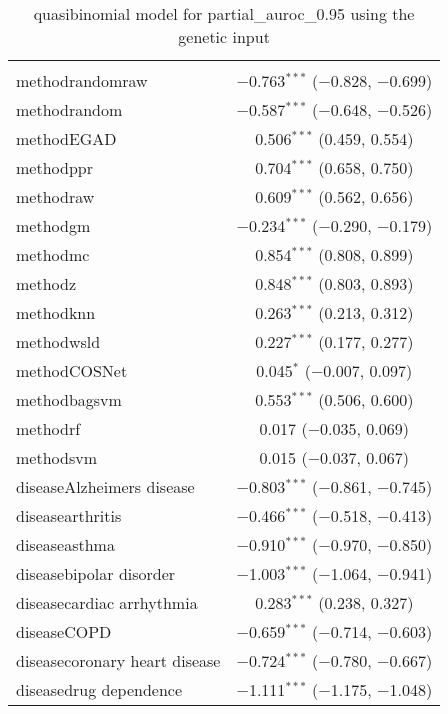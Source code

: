 
\begin{table}[!htbp] \centering 
  \caption{quasibinomial model for partial_auroc_0.95 using the genetic input} 
  \label{} 
\begin{tabular}{@{\extracolsep{5pt}}lc} 
\\[-1.8ex]\hline 
\hline \\[-1.8ex] 
 methodrandomraw & $-$0.763$^{***}$ ($-$0.828, $-$0.699) \\ 
  methodrandom & $-$0.587$^{***}$ ($-$0.648, $-$0.526) \\ 
  methodEGAD & 0.506$^{***}$ (0.459, 0.554) \\ 
  methodppr & 0.704$^{***}$ (0.658, 0.750) \\ 
  methodraw & 0.609$^{***}$ (0.562, 0.656) \\ 
  methodgm & $-$0.234$^{***}$ ($-$0.290, $-$0.179) \\ 
  methodmc & 0.854$^{***}$ (0.808, 0.899) \\ 
  methodz & 0.848$^{***}$ (0.803, 0.893) \\ 
  methodknn & 0.263$^{***}$ (0.213, 0.312) \\ 
  methodwsld & 0.227$^{***}$ (0.177, 0.277) \\ 
  methodCOSNet & 0.045$^{*}$ ($-$0.007, 0.097) \\ 
  methodbagsvm & 0.553$^{***}$ (0.506, 0.600) \\ 
  methodrf & 0.017 ($-$0.035, 0.069) \\ 
  methodsvm & 0.015 ($-$0.037, 0.067) \\ 
  diseaseAlzheimers disease & $-$0.803$^{***}$ ($-$0.861, $-$0.745) \\ 
  diseasearthritis & $-$0.466$^{***}$ ($-$0.518, $-$0.413) \\ 
  diseaseasthma & $-$0.910$^{***}$ ($-$0.970, $-$0.850) \\ 
  diseasebipolar disorder & $-$1.003$^{***}$ ($-$1.064, $-$0.941) \\ 
  diseasecardiac arrhythmia & 0.283$^{***}$ (0.238, 0.327) \\ 
  diseaseCOPD & $-$0.659$^{***}$ ($-$0.714, $-$0.603) \\ 
  diseasecoronary heart disease & $-$0.724$^{***}$ ($-$0.780, $-$0.667) \\ 
  diseasedrug dependence & $-$1.111$^{***}$ ($-$1.175, $-$1.048) \\ 

\end{tabular}
\end{table}
